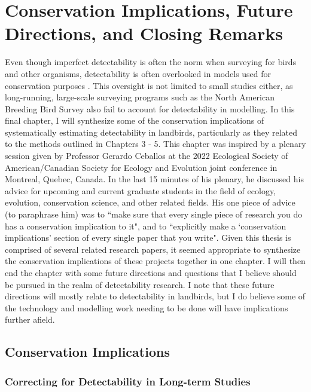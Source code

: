 \chapter{Conservation Implications, Future Directions, and Closing Remarks}

\par Even though imperfect detectability is often the norm when surveying for birds and other organisms, detectability is often overlooked in models used for conservation purposes \citep{bennett_how_2024}.
This oversight is not limited to small studies either, as long-running, large-scale surveying programs such as the North American Breeding Bird Survey also fail to account for detectability in modelling.
In this final chapter, I will synthesize some of the conservation implications of systematically estimating detectability in landbirds, particularly as they related to the methods outlined in Chapters 3 - 5. 
This chapter was inspired by a plenary session given by Professor Gerardo Ceballos at the 2022 Ecological Society of American/Canadian Society for Ecology and Evolution joint conference in Montreal, Quebec, Canada.
In the last 15 minutes of his plenary, he discussed his advice for upcoming and current graduate students in the field of ecology, evolution, conservation science, and other related fields.
His one piece of advice (to paraphrase him) was to ``make sure that every single piece of research you do has a conservation implication to it", and to ``explicitly make a `conservation implications' section of every single paper that you write".
Given this thesis is comprised of several related research papers, it seemed appropriate to synthesize the conservation implications of these projects together in one chapter.
I will then end the chapter with some future directions and questions that I believe should be pursued in the realm of detectability research.
I note that these future directions will mostly relate to detectability in landbirds, but I do believe some of the technology and modelling work needing to be done will have implications further afield.

\section{Conservation Implications}

\subsection{Correcting for Detectability in Long-term Studies}

